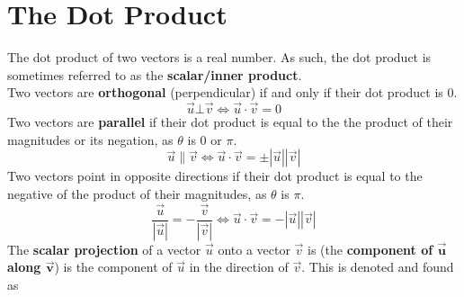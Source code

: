 \documentclass[../Calculus_\Roman{3}]{subfiles}
\begin{document}
			\section{The Dot Product}
				The dot product of two vectors is a real number. As such, the dot product is sometimes referred to as the \textbf{scalar/inner product}. \\
				Two vectors are \textbf{orthogonal} (perpendicular) if and only if their dot product is 0.
					\[\vec{u} \bot \vec{v} \iff \vec{u} \cdot \vec{v} = 0\]
				Two vectors are \textbf{parallel} if their dot product is equal to the the product of their magnitudes or its negation, as $\theta$ is 0 or $\pi$.
					\[\vec{u} \parallel \vec{v} \iff \vec{u} \cdot \vec{v} = \pm|\vec{u}||\vec{v}|\]
				Two vectors point in opposite directions if their dot product is equal to the negative of the product of their magnitudes, as $\theta$ is $\pi$.
					\[\frac{\vec{u}}{|\vec{u}|} = -\frac{\vec{v}}{|\vec{v}|} \iff \vec{u} \cdot \vec{v} = -|\vec{u}||\vec{v}|\]
				The \textbf{scalar projection} of a vector $\vec{u}$ onto a vector $\vec{v}$ is (the \textbf{component of $\bm{\vec{u}}$ along $\bm{\vec{v}}$}) is the component of $\vec{u}$ in the direction of $\vec{v}$. This is denoted and found as 
\end{document}
